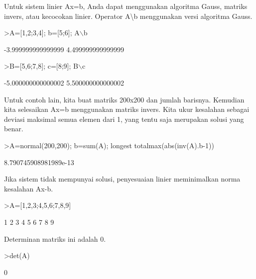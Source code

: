 \documentclass[a4paper,10pt]{article}
\begin{document}
\begin{eulernotebook}
\begin{eulercomment}
\begin{eulercomment}
\begin{eulercomment}
\begin{eulercomment}
\begin{eulercomment}
\begin{eulercomment}
\begin{eulercomment}
Untuk sistem linier Ax=b, Anda dapat menggunakan algoritma Gauss,
matriks invers, atau kecocokan linier. Operator A\textbackslash{}b menggunakan versi
algoritma Gauss.
\end{eulercomment}
\begin{eulerprompt}
>A=[1,2;3,4]; b=[5;6]; A\(\backslash\)b
\end{eulerprompt}
\begin{euleroutput}
       -3.999999999999999 
        4.499999999999999 
\end{euleroutput}
\begin{eulerprompt}
>B=[5,6;7,8]; c=[8;9]; B\(\backslash\)c
\end{eulerprompt}
\begin{euleroutput}
       -5.000000000000002 
        5.500000000000002 
\end{euleroutput}
\begin{eulercomment}
Untuk contoh lain, kita buat matriks 200x200 dan jumlah barisnya.
Kemudian kita selesaikan Ax=b menggunakan matriks invers. Kita ukur
kesalahan sebagai deviasi maksimal semua elemen dari 1, yang tentu
saja merupakan solusi yang benar.
\end{eulercomment}
\begin{eulerprompt}
>A=normal(200,200); b=sum(A); longest totalmax(abs(inv(A).b-1))
\end{eulerprompt}
\begin{euleroutput}
    8.790745908981989e-13 
\end{euleroutput}
\begin{eulercomment}
Jika sistem tidak mempunyai solusi, penyesuaian linier meminimalkan
norma kesalahan Ax-b.
\end{eulercomment}
\begin{eulerprompt}
>A=[1,2,3;4,5,6;7,8,9]
\end{eulerprompt}
\begin{euleroutput}
              1             2             3 
              4             5             6 
              7             8             9 
\end{euleroutput}
\begin{eulercomment}
Determinan matriks ini adalah 0.
\end{eulercomment}
\begin{eulerprompt}
>det(A)
\end{eulerprompt}
\begin{euleroutput}
  0
\end{euleroutput}

\end{eulercomment}
\end{eulercomment}
\end{eulercomment}
\end{eulercomment}
\end{eulercomment}
\end{eulercomment}
\end{eulernotebook}
\end{document}
